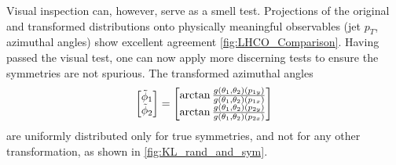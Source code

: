             Visual inspection can, however, serve as a smell test.
            Projections of the original and transformed distributions onto physically meaningful observables (jet \(p_T\), azimuthal angles) show excellent agreement \cref{fig:LHCO_Comparison}.
            Having passed the visual test, one can now apply more discerning tests to ensure the symmetries are not spurious.
            The transformed azimuthal angles
            \[
                \mqty[\tilde{\phi}_1\\\tilde{\phi}_2] = \mqty[
                    \arctan \frac{g(\theta_1, \theta_2)(p_{1y})}{g(\theta_1, \theta_2)(p_{1x})} \\
                    \arctan \frac{g(\theta_1, \theta_2)(p_{2y})}{g(\theta_1, \theta_2)(p_{2x})}
                ]
            \]
            are uniformly distributed only for true symmetries, and not for any other transformation, as shown in \cref{fig:KL_rand_and_sym}.
